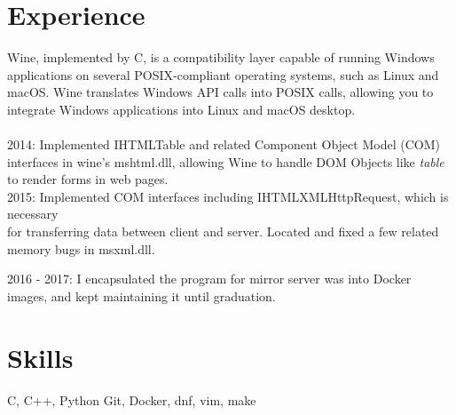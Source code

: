 

\section{Experience}

{
	{Wine, implemented by C, is a compatibility layer capable of running Windows applications on several %
	POSIX-compliant operating systems, such as Linux and macOS. Wine translates Windows API %
	calls into POSIX calls, allowing you to integrate Windows applications into Linux and %
	macOS desktop.\\ \\}
	{2014: Implemented IHTMLTable and related Component Object Model (COM) interfaces in wine's mshtml.dll, allowing Wine to handle DOM Objects like \textit{table} to render forms in web pages.}\\
	{2015: Implemented COM interfaces including IHTMLXMLHttpRequest, which is necessary \\
	for transferring data between client and server. Located and fixed a few related memory bugs in msxml.dll.}
}





{
2016 - 2017: I encapsulated the program for mirror server was into Docker images, and kept maintaining it until graduation. 
}

\vspace{-5mm}

\section{Skills}
{ C, C++, Python
	}
{Git, Docker, dnf, vim, make
	}
%




